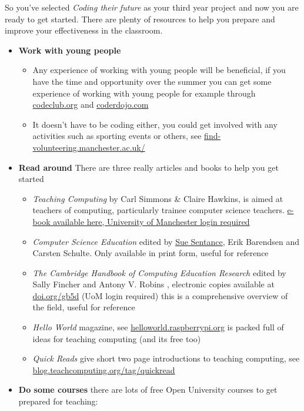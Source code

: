 \documentclass[
  12pt,
]{book}
\providecommand{\tightlist}{%
  \setlength{\itemsep}{0pt}\setlength{\parskip}{0pt}}
\begin{document}
So you've selected \emph{Coding their future} as your third year project and now you are ready to get started. There are plenty of resources to help you prepare and improve your effectiveness in the classroom.

\begin{itemize}
\tightlist
\item
  \textbf{Work with young people}

  \begin{itemize}
  \tightlist
  \item
    Any experience of working with young people will be beneficial, if you have the time and opportunity over the summer you can get some experience of working with young people for example through \href{https://codeclub.org/}{codeclub.org} and \href{https://coderdojo.com/}{coderdojo.com}
  \item
    It doesn't have to be coding either, you could get involved with any activities such as sporting events or others, see \href{https://find-volunteering.manchester.ac.uk/}{find-volunteering.manchester.ac.uk/}
  \end{itemize}
\item
  \textbf{Read around} There are three really articles and books to help you get started

  \begin{itemize}
  \tightlist
  \item
    \emph{Teaching Computing} \citep{teachingcomputing} by Carl Simmons \& Claire Hawkins, is aimed at teachers of computing, particularly trainee computer science teachers. \href{http://dx.doi.org.manchester.idm.oclc.org/10.4135/9781473919785}{e-book available here, University of Manchester login required}
  \item
    \emph{Computer Science Education} \citep{cse} edited by \href{https://en.wikipedia.org/wiki/Sue_Sentance}{Sue Sentance}, Erik Barendsen and Carsten Schulte. Only available in print form, useful for reference
  \item
    \emph{The Cambridge Handbook of Computing Education Research} edited by Sally Fincher and Antony V. Robins \citep{CERhandbook}, electronic copies available at \href{https://doi.org/gb5d}{doi.org/gb5d} (UoM login required) this is a comprehensive overview of the field, useful for reference
  \item
    \emph{Hello World} magazine, see \href{https://helloworld.raspberrypi.org/}{helloworld.raspberrypi.org} is packed full of ideas for teaching computing (and its free too)
  \item
    \emph{Quick Reads} give short two page introductions to teaching computing, see \href{https://blog.teachcomputing.org/tag/quickread/}{blog.teachcomputing.org/tag/quickread}
  \end{itemize}
\item
  \textbf{Do some courses} there are lots of free Open University courses to get prepared for teaching:


\end{itemize}
\end{document}
